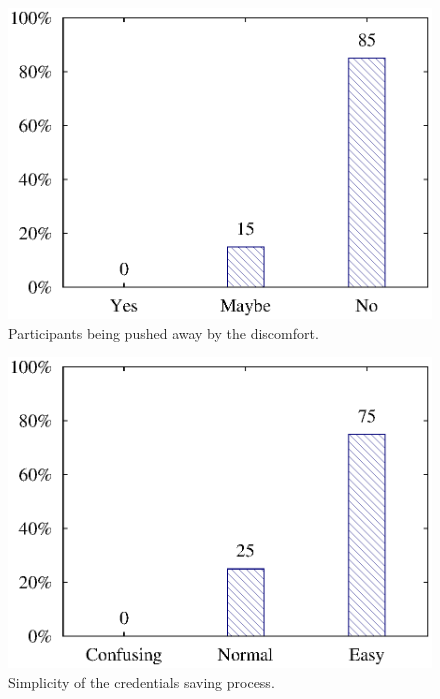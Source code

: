 \begin{figure}[H]
\centering
\includegraphics[scale=.7]{files/question8/question8.eps}
\caption{Participants being pushed away by the discomfort.}
\label{fig:digraph}
\end{figure}

\begin{figure}[H]
\centering
\includegraphics[scale=.7]{files/question9/question9.eps}
\caption{Simplicity of the credentials saving process.}
\label{fig:digraph}
\end{figure}

